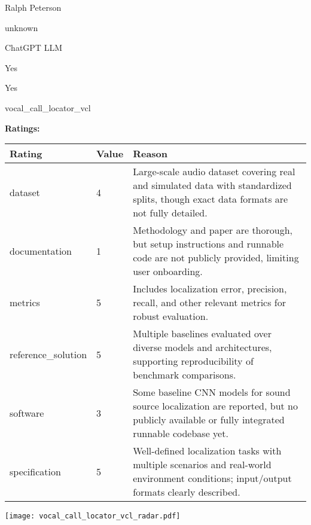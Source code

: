 {{\begin{description}[labelwidth=4cm, labelsep=1em, leftmargin=4cm, itemsep=0.1em, parsep=0em]
  \item[contact.name:] Ralph Peterson
  \item[contact.email:] unknown
  \item[results.links.name:] ChatGPT LLM
  \item[fair.reproducible:] Yes
  \item[fair.benchmark\_ready:] Yes
  \item[id:] vocal\_call\_locator\_vcl
  \item[Citations:] \cite{neurips2024_c00d37d6}
\end{description}

{\bf Ratings:} ~ \\

\begin{tabular}{p{} p{} p{}}
\hline
Rating & Value & Reason \\
\hline
dataset & 4 & Large-scale audio dataset covering real and simulated data with
standardized splits, though exact data formats are not fully detailed.
 \\
documentation & 1 & Methodology and paper are thorough, but setup instructions and runnable
code are not publicly provided, limiting user onboarding.
 \\
metrics & 5 & Includes localization error, precision, recall, and other relevant metrics
for robust evaluation.
 \\
reference\_solution & 5 & Multiple baselines evaluated over diverse models and architectures,
supporting reproducibility of benchmark comparisons.
 \\
software & 3 & Some baseline CNN models for sound source localization are reported,
but no publicly available or fully integrated runnable codebase yet.
 \\
specification & 5 & Well-defined localization tasks with multiple scenarios and real-world
environment conditions; input/output formats clearly described.
 \\
\hline
\end{tabular}

\texttt{[image: vocal\_call\_locator\_vcl\_radar.pdf]}
}}
\clearpage